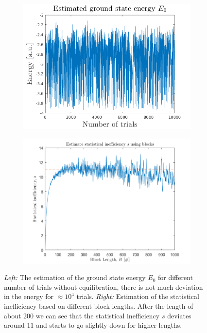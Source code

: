 \begin{figure}[H]
	\centering
	\captionsetup[subfigure]{justification=centering}
	\begin{subfigure}[b]{0.4\textwidth}
		\centering
		\includegraphics[width=\textwidth]{graphics/task2/local_energy.png}
	\end{subfigure}
	\begin{subfigure}[b]{0.4\textwidth}
		\centering
		\includegraphics[width=\textwidth]{graphics/task2/block_error.png}
	\end{subfigure}
	\caption{\textit{Left:} The estimation of the ground state energy $E_0$ for different number of trials without equilibration, there is not much deviation in the energy for $\approx10^4$ trials. \textit{Right:} Estimation of the statistical inefficiency based on different block lengths. After the length of about 200 we can see that the statistical inefficiency $s$ deviates around 11 and starts to go slightly down for higher lengths.}
	\label{fig:block_error}
\end{figure}




